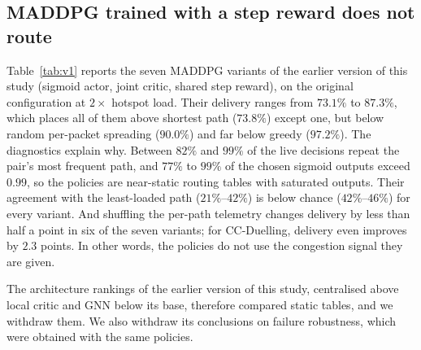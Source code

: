 \documentclass[10pt,journal,comsoc]{IEEEtran}
\begin{document}
\subsection{MADDPG trained with a step reward does not route}
\label{sec:v1}
Table~\ref{tab:v1} reports the seven MADDPG variants of the earlier version of this study (sigmoid actor, joint critic, shared step reward), on the original configuration at $2\times$ hotspot load. Their delivery ranges from $73.1\%$ to $87.3\%$, which places all of them above shortest path ($73.8\%$) except one, but below random per-packet spreading ($90.0\%$) and far below greedy ($97.2\%$). The diagnostics explain why. Between $82\%$ and $99\%$ of the live decisions repeat the pair's most frequent path, and $77\%$ to $99\%$ of the chosen sigmoid outputs exceed $0.99$, so the policies are near-static routing tables with saturated outputs. Their agreement with the least-loaded path ($21\%$--$42\%$) is below chance ($42\%$--$46\%$) for every variant. And shuffling the per-path telemetry changes delivery by less than half a point in six of the seven variants; for CC-Duelling, delivery even improves by $2.3$ points. In other words, the policies do not use the congestion signal they are given.

\begin{table}[!t]
  \centering
  \caption{MADDPG with step reward, sigmoid actor and joint critic, original configuration, $2\times$ hotspot, no failures. Static, least-loaded, chance and saturated in \%; shuffle loss is the PDR lost (pp) when path telemetry is shuffled (negative: gained).}
  \label{tab:v1}
  \footnotesize
  \setlength{\tabcolsep}{3pt}
\end{table}

The architecture rankings of the earlier version of this study, centralised above local critic and GNN below its base, therefore compared static tables, and we withdraw them. We also withdraw its conclusions on failure robustness, which were obtained with the same policies.
\end{document}
